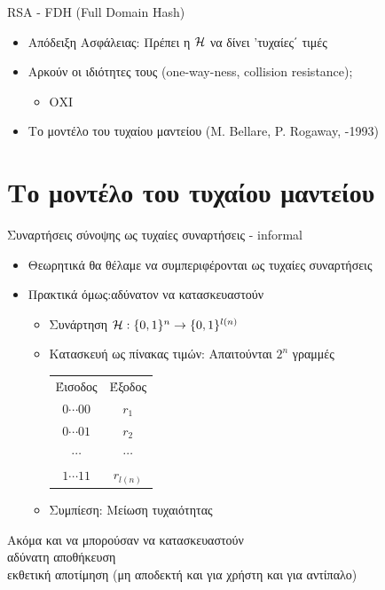 \documentclass{beamer}
\begin{document}
\begin{frame}[allowframebreaks]{RSA - FDH (Full Domain Hash)}
\begin{itemize}
\item Απόδειξη Ασφάλειας: Πρέπει η $\mathcal{H}$ να δίνει 'τυχαίες΄ τιμές
\item Αρκούν οι ιδιότητες τους (one-way-ness, collision resistance); 
\begin{itemize}
\item \alert{ΟΧΙ}
\end{itemize}
\item Το μοντέλο του τυχαίου μαντείου (M. Bellare, P. Rogaway, -1993)
\end{itemize}
\end{frame}

 
\section{Το μοντέλο του τυχαίου μαντείου}

\begin{frame}{Συναρτήσεις σύνοψης ως τυχαίες συναρτήσεις - informal}
\begin{itemize}
\item Θεωρητικά θα θέλαμε να συμπεριφέρονται ως τυχαίες συναρτήσεις
\pause
\item Πρακτικά όμως:\alert{αδύνατον να κατασκευαστούν}
\pause
\begin{itemize}
\item Συνάρτηση $\mathcal{H}: \{0,1\}^n \rightarrow \{ 0,1 \}^{l(n)}$
\pause
\item Κατασκευή ως πίνακας τιμών: Απαιτούνται $2^n$ γραμμές
\begin{tabular}{|c|c|}
Έισοδος & Έξοδος \\
$0\cdots00$ & $r_1$ \\
$0\cdots01$ & $r_2$\\
$\cdots$ & $\cdots$\\
$1\cdots11$ & $r_{l(n)}$\\
\end{tabular}
\pause
\item Συμπίεση: Μείωση τυχαιότητας
\end{itemize}
\end{itemize}
\pause
Ακόμα και να μπορούσαν να κατασκευαστούν \\
αδύνατη αποθήκευση\\
εκθετική αποτίμηση (μη αποδεκτή και για χρήστη και για αντίπαλο)
\end{frame}
\end{document}
